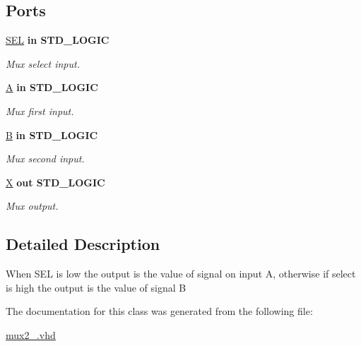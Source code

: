 \subsection*{Ports}
 \begin{DoxyCompactItemize}
\item 
\mbox{\label{classmux2__1_a8684595638f5b8f98be8efc51ea5106a}} 
\hyperlink{classmux2__1_a8684595638f5b8f98be8efc51ea5106a}{S\+EL}  {\bfseries {\bfseries \textcolor{vhdlchar}{in}\textcolor{vhdlchar}{ }}} {\bfseries \textcolor{vhdlchar}{S\+T\+D\+\_\+\+L\+O\+G\+IC}\textcolor{vhdlchar}{ }} 
\begin{DoxyCompactList}\small\item\em Mux select input. \end{DoxyCompactList}\item 
\mbox{\label{classmux2__1_adeb7d89825218bceeb32336cb4596ba2}} 
\hyperlink{classmux2__1_adeb7d89825218bceeb32336cb4596ba2}{A}  {\bfseries {\bfseries \textcolor{vhdlchar}{in}\textcolor{vhdlchar}{ }}} {\bfseries \textcolor{vhdlchar}{S\+T\+D\+\_\+\+L\+O\+G\+IC}\textcolor{vhdlchar}{ }} 
\begin{DoxyCompactList}\small\item\em Mux first input. \end{DoxyCompactList}\item 
\mbox{\label{classmux2__1_ae726f818303beb2456b17b217b6e8dda}} 
\hyperlink{classmux2__1_ae726f818303beb2456b17b217b6e8dda}{B}  {\bfseries {\bfseries \textcolor{vhdlchar}{in}\textcolor{vhdlchar}{ }}} {\bfseries \textcolor{vhdlchar}{S\+T\+D\+\_\+\+L\+O\+G\+IC}\textcolor{vhdlchar}{ }} 
\begin{DoxyCompactList}\small\item\em Mux second input. \end{DoxyCompactList}\item 
\mbox{\label{classmux2__1_a0947359e221b1e58716e8dcaf6c2950b}} 
\hyperlink{classmux2__1_a0947359e221b1e58716e8dcaf6c2950b}{X}  {\bfseries {\bfseries \textcolor{vhdlchar}{out}\textcolor{vhdlchar}{ }}} {\bfseries \textcolor{vhdlchar}{S\+T\+D\+\_\+\+L\+O\+G\+IC}\textcolor{vhdlchar}{ }} 
\begin{DoxyCompactList}\small\item\em Mux output. \end{DoxyCompactList}\end{DoxyCompactItemize}


\subsection{Detailed Description}
When S\+EL is low the output is the value of signal on input A, otherwise if select is high the output is the value of signal B 

The documentation for this class was generated from the following file\+:\begin{DoxyCompactItemize}
\item 
\hyperlink{mux2__1_8vhd}{mux2\+\_.\+vhd}\end{DoxyCompactItemize}
